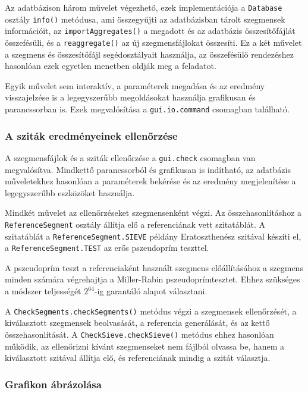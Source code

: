 Az adatbázison három művelet végezhető, ezek implementációja a \texttt{Database} osztály \texttt{info()} metódusa, ami összegyűjti az adatbázisban tárolt szegmensek információit, az \texttt{importAggregates()} a megadott és az adatbázis összesítőfájlát összefésüli, és a \texttt{reaggregate()} az új szegmensfájlokat összesíti.
Ez a két művelet a szegmens és összesítőfájl segédosztályait használja, az összefésülő rendezéshez hasonlóan ezek egyetlen menetben oldják meg a feladatot.

Egyik művelet sem interaktív, a paraméterek megadása és az eredmény visszajelzése is a legegyszerűbb megoldásokat használja grafikusan és parancssorban is.
Ezek megvalósítása a \texttt{gui.io.command} csomagban található.

\subsubsection{A sziták eredményeinek ellenőrzése}

A szegmensfájlok és a sziták ellenőrzése a \texttt{gui.check} csomagban van megvalósítva.
Mindkettő parancssorból és grafikusan is indítható, az adatbázis műveletekhez hasonlóan a paraméterek bekérése és az eredmény megjelenítése a legegyszerűbb eszközöket használja.

Mindkét művelet az ellenőrzéseket szegmensenként végzi.
Az összehasonlításhoz a \texttt{ReferenceSegment} osztály állítja elő a referenciának vett szitatáblát.
A szitatáblát a \texttt{ReferenceSegment.SIEVE} példány Eratoszthenész szitával készíti el, a \texttt{ReferenceSegment.TEST} az erős pszeudoprím teszttel.

A pszeudoprím teszt a referenciaként használt szegmens előállításához a szegmens minden számára végrehajtja a Miller-Rabin pszeudoprímtesztet.
Ehhez szükséges a módszer teljességét $2^{64}$-ig garantáló alapot választani\cite{pseudoprimebase}.

A \texttt{CheckSegments.checkSegments()} metódus végzi a szegmensek ellenőrzését, a kiválasztott szegmensek beolvasását, a referencia generálását, és az kettő összehasonlítását.
A \texttt{CheckSieve.checkSieve()} metódus ehhez hasonlóan működik, az ellenőrizni kívánt szegmenseket nem fájlból olvassa be, hanem a kiválasztott szitával állítja elő, és referenciának mindig a szitát választja.

\subsubsection{Grafikon ábrázolása}

